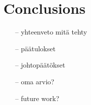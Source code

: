 \section{Conclusions} 
\label{sec:conclusions}


\begin{itemize}
\item[--]yhteenveto mitä tehty
\item[--]päätulokset
\item[--]johtopäätökset
\item[--]oma arvio?
\item[--]future work?
\end{itemize}


\clearpage